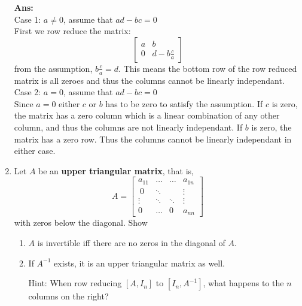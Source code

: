 \documentclass[12pt,a4paper]{amsart}
\newcommand\sol[1]{
\medskip
\begin{mdframed}
\textbf{Ans:\\} #1
\end{mdframed}
\medskip
}
\begin{document}
\begin{enumerate}
 \sol{
   Case 1: $a \neq 0$, assume that $ad-bc=0$\\
   First we row reduce the matrix:
   $$\left[\begin{matrix} a & b \\ 0 & d-b\frac{c}{a} \end{matrix}\right]$$ from the assumption, $b\frac{c}{a}=d$. This means 
   the bottom row of the row reduced matrix is all zeroes and thus the columns cannot be linearly independant.
  \medskip\\
   Case 2: $a=0$, assume that $ad-bc=0$\\
   Since $a=0$ either $c$ or $b$ has to be zero to satisfy the assumption. If $c$ is zero, the matrix has a zero column which is a linear combination of any other column, and thus the columns are not linearly independant.
   If $b$ is zero, the matrix has a zero row. Thus the columns cannot be linearly independant in either case.
 }





\item Let $A$ be an {\bf upper triangular matrix}, that is,
  \[ A = \left[\begin{matrix} a_{11} & \dots &  \dots & a_{1n} \\\
        0 & \ddots &  & \vdots \\
        \vdots & \ddots & \ddots & \vdots \\
        0 &  \dots & 0 & a_{nn} \end{matrix}\right] \]
  with zeros below the diagonal. Show
\begin{enumerate}
\item
 $A$ is invertible iff there are no zeros in the diagonal of $A$.
\item
 If $A^{-1}$ exists, it is an upper triangular matrix as well. 

 Hint: When row reducing $[A,I_n]$ to $[I_n,A^{-1}]$, what happens to the $n$ columns on the right? 
\end{enumerate}


\end{enumerate}
\end{document}
